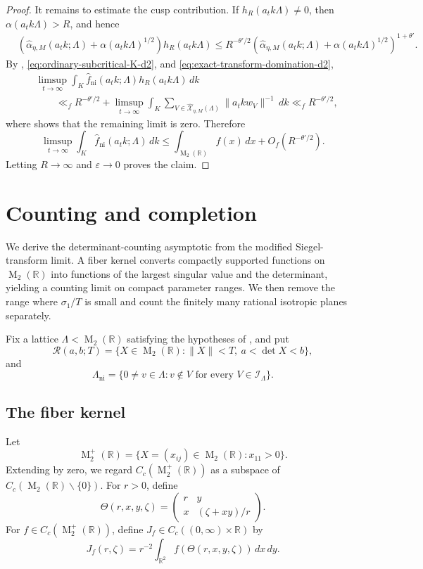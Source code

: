 \documentclass[reqno,11pt]{amsart}
\theoremstyle{definition}
\theoremstyle{remark}
\numberwithin{equation}{section}
\newcommand{\M}{\operatorname{M}}
\begin{document}
\begin{proof}
It remains to estimate the cusp contribution. If
$h_R(a_tk\Lambda)\ne0$, then $\alpha(a_tk\Lambda)>R$, and hence
\[
\begin{aligned}
&\left(
\widehat\alpha_{\eta,M}(a_tk;\Lambda)
+
\alpha(a_tk\Lambda)^{1/2}
\right)h_R(a_tk\Lambda) \le
R^{-\theta'/2}
\left(
\widehat\alpha_{\eta,M}(a_tk;\Lambda)
+
\alpha(a_tk\Lambda)^{1/2}
\right)^{1+\theta'}.
\end{aligned}
\]
By ,
\eqref{eq:ordinary-subcritical-K-d2}, and
\eqref{eq:exact-transform-domination-d2},
\[
\begin{aligned}
&\limsup_{t\to\infty}
\int_K
\widehat f_{\operatorname{ni}}(a_tk;\Lambda)
h_R(a_tk\Lambda)\,dk\\
&\qquad\ll_f
R^{-\theta'/2}
+
\limsup_{t\to\infty}
\int_K
\sum_{V\in\widehat{\mathcal X}_{\eta,M}(\Lambda)}
\|a_tkw_V\|^{-1}\,dk
\ll_f R^{-\theta'/2},
\end{aligned}
\]
where  shows that the
remaining limit is zero. Therefore
\[
\limsup_{t\to\infty}
\int_K\widehat f_{\operatorname{ni}}(a_tk;\Lambda)\,dk
\le
\int_{\M_2(\mathbb R)}f(x)\,dx+O_f(R^{-\theta'/2}).
\]
Letting $R\to\infty$ and $\varepsilon\to0$ proves the claim.
\end{proof}
\section{Counting and completion}
\label{sec:counting-completion}
We derive the determinant-counting asymptotic from the modified
Siegel-transform limit. A fiber kernel converts compactly supported
functions on $\M_2(\mathbb R)$ into functions of the largest singular
value and the determinant, yielding a counting limit on compact parameter
ranges. We then remove the range where $\sigma_1/T$ is small and count the
finitely many rational isotropic planes separately.



Fix a lattice $\Lambda<\M_2(\mathbb R)$ satisfying the hypotheses of
, and put
$$
\mathcal R(a,b;T)
=
\{X\in\M_2(\mathbb R):\|X\|<T,\ a<\det X<b\},
$$
and
$$
\Lambda_{\operatorname{ni}}
=
\{0\ne v\in\Lambda:
v\notin V\text{ for every }V\in\mathcal I_\Lambda\}.
$$

\subsection{The fiber kernel}

Let
$$
\M_2^+(\mathbb R)
=
\{X=(x_{ij})\in\M_2(\mathbb R):x_{11}>0\}.
$$
Extending by zero, we regard $C_c(\M_2^+(\mathbb R))$ as a subspace of
$C_c(\M_2(\mathbb R)\smallsetminus\{0\})$. For $r>0$, define
$$
\Theta(r,x,y,\zeta)
=
\begin{pmatrix}
r&y\\
x&(\zeta+xy)/r
\end{pmatrix}.
$$
For $f\in C_c(\M_2^+(\mathbb R))$, define
$J_f\in C_c((0,\infty)\times\mathbb R)$ by
\begin{equation}\label{eq:def-Jf-d2}
J_f(r,\zeta)
=
r^{-2}
\int_{\mathbb R^2}
f(\Theta(r,x,y,\zeta))\,dx\,dy.
\end{equation}
\end{document}
